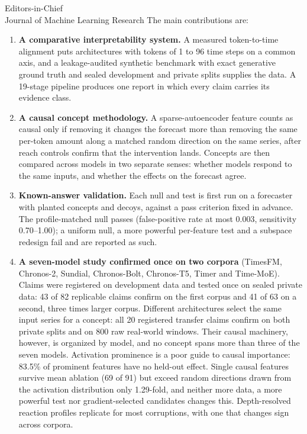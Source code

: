 \documentclass[11pt]{letter}
\begin{document}
\begin{letter}{Editors-in-Chief\\Journal of Machine Learning Research}
The main contributions are:
\begin{enumerate}
  \item \textbf{A comparative interpretability system.} A measured token-to-time alignment puts architectures with
  tokens of 1 to 96 time steps on a common axis, and a leakage-audited synthetic benchmark with exact generative ground
  truth and sealed development and private splits supplies the data. A 19-stage pipeline produces one report in which
  every claim carries its evidence class.
  \item \textbf{A causal concept methodology.} A sparse-autoencoder feature counts as causal only if removing it changes
  the forecast more than removing the same per-token amount along a matched random direction on the same series, after
  reach controls confirm that the intervention lands. Concepts are then compared across models in two separate senses:
  whether models respond to the same inputs, and whether the effects on the forecast agree.
  \item \textbf{Known-answer validation.} Each null and test is first run on a forecaster with planted concepts and
  decoys, against a pass criterion fixed in advance. The profile-matched null passes (false-positive rate at most
  0.003, sensitivity 0.70--1.00); a uniform null, a more powerful per-feature test and a subspace redesign fail and are
  reported as such.
  \item \textbf{A seven-model study confirmed once on two corpora} (TimesFM, Chronos-2, Sundial, Chronos-Bolt,
  Chronos-T5, Timer and Time-MoE). Claims were registered on development data and tested once on sealed private data:
  43 of 82 replicable claims confirm on the first corpus and 41 of 63 on a second, three times larger corpus.
  Different architectures select the same input series for a concept: all 20 registered transfer claims confirm on
  both private splits and on 800 raw real-world windows. Their causal machinery, however, is organized by model, and no
  concept spans more than three of the seven models. Activation prominence is a poor guide to causal importance:
  83.5\% of prominent features have no held-out effect. Single causal features survive mean ablation (69 of 91) but
  exceed random directions drawn from the activation distribution only 1.29-fold, and neither more data, a more
  powerful test nor gradient-selected candidates changes this. Depth-resolved reaction profiles replicate for most
  corruptions, with one that changes sign across corpora.
\end{enumerate}


\end{letter}
\end{document}
